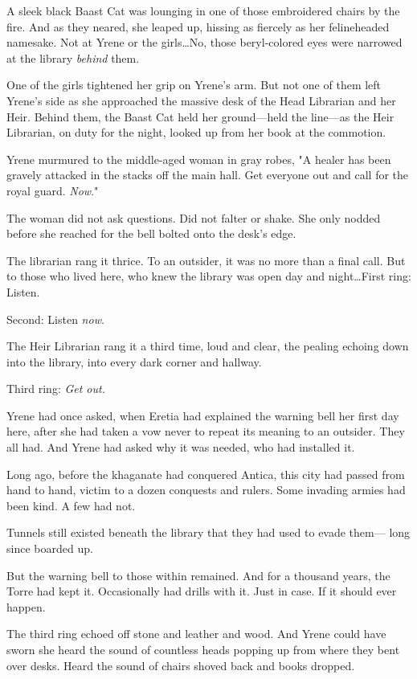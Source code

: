 A sleek black Baast Cat was lounging in one of those embroidered chairs by the fire.
And as they neared, she leaped up, hissing as fiercely as her felineheaded namesake.
Not at Yrene or the girls\ldots No, those beryl-colored eyes were narrowed at the library \emph{behind} them.

One of the girls tightened her grip on Yrene's arm.
But not one of them left Yrene's side as she approached the massive desk of the Head Librarian and her Heir.
Behind them, the Baast Cat held her ground---held the line---as the Heir Librarian, on duty for the night, looked up from her book at the commotion.

Yrene murmured to the middle-aged woman in gray robes, "A healer has been gravely attacked in the stacks off the main hall.
Get everyone out and call for the royal guard.
\emph{Now}."

The woman did not ask questions.
Did not falter or shake.
She only nodded before she reached for the bell bolted onto the desk's edge.

The librarian rang it thrice.
To an outsider, it was no more than a final call.
But to those who lived here, who knew the library was open day and night\ldots First ring: Listen.

Second: Listen \emph{now}.

The Heir Librarian rang it a third time, loud and clear, the pealing echoing down into the library, into every dark corner and hallway.

Third ring: \emph{Get out.}

Yrene had once asked, when Eretia had explained the warning bell her first day here, after she had taken a vow never to repeat its meaning to an outsider.
They all had.
And Yrene had asked why it was needed, who had installed it.

Long ago, before the khaganate had conquered Antica, this city had passed from hand to hand, victim to a dozen conquests and rulers.
Some invading armies had been kind.
A few had not.

Tunnels still existed beneath the library that they had used to evade them--- long since boarded up.

But the warning bell to those within remained.
And for a thousand years, the Torre had kept it.
Occasionally had drills with it.
Just in case.
If it should ever happen.

The third ring echoed off stone and leather and wood.
And Yrene could have sworn she heard the sound of countless heads popping up from where they bent over desks.
Heard the sound of chairs shoved back and books dropped.

